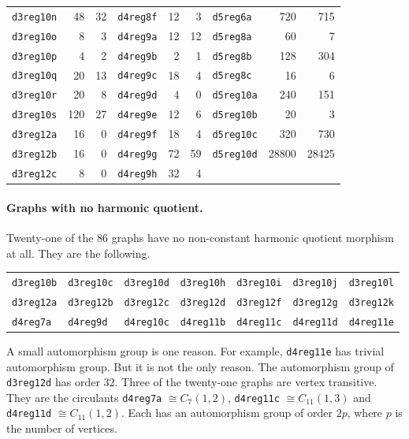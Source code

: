 \documentclass[12pt,letterpaper]{article}
\theoremstyle{definition}
\begin{document}
\begin{center}
\begin{tabular}{lrr|lrr|lrr}
{\tt d3reg10n} & 48 & 32 & {\tt d4reg8f} & 12 & 3 & {\tt d5reg6a} & 720 & 715 \\
{\tt d3reg10o} & 8 & 3 & {\tt d4reg9a} & 12 & 12 & {\tt d5reg8a} & 60 & 7 \\
{\tt d3reg10p} & 4 & 2 & {\tt d4reg9b} & 2 & 1 & {\tt d5reg8b} & 128 & 304 \\
{\tt d3reg10q} & 20 & 13 & {\tt d4reg9c} & 18 & 4 & {\tt d5reg8c} & 16 & 6 \\
{\tt d3reg10r} & 20 & 8 & {\tt d4reg9d} & 4 & 0 & {\tt d5reg10a} & 240 & 151 \\
{\tt d3reg10s} & 120 & 27 & {\tt d4reg9e} & 12 & 6 & {\tt d5reg10b} & 20 & 3 \\
{\tt d3reg12a} & 16 & 0 & {\tt d4reg9f} & 18 & 4 & {\tt d5reg10c} & 320 & 730 \\
{\tt d3reg12b} & 16 & 0 & {\tt d4reg9g} & 72 & 59 & {\tt d5reg10d} & 28800 & 28425 \\
{\tt d3reg12c} & 8 & 0 & {\tt d4reg9h} & 32 & 4 &  & &  \\
\hline
\end{tabular}
\end{center}

\paragraph{Graphs with no harmonic quotient.}
Twenty-one of the $86$ graphs have no non-constant harmonic quotient
morphism at all. They are the following.
\begin{center}
\begin{tabular}{lllllll}
{\tt d3reg10b} & {\tt d3reg10c} & {\tt d3reg10d} & {\tt d3reg10h} & {\tt d3reg10i} & {\tt d3reg10j} & {\tt d3reg10l} \\
{\tt d3reg12a} & {\tt d3reg12b} & {\tt d3reg12c} & {\tt d3reg12d} & {\tt d3reg12f} & {\tt d3reg12g} & {\tt d3reg12k} \\
{\tt d4reg7a} & {\tt d4reg9d} & {\tt d4reg10c} & {\tt d4reg11b} & {\tt d4reg11c} & {\tt d4reg11d} & {\tt d4reg11e} \\
\end{tabular}
\end{center}
 A small automorphism group is one reason.
For example, {\tt d4reg11e} has trivial automorphism group. But it is not
the only reason. The automorphism group of {\tt d3reg12d} has order $32$.
Three of the twenty-one graphs are vertex transitive. They are the
circulants {\tt d4reg7a} $\cong C_7(1,2)$, {\tt d4reg11c} $\cong C_{11}(1,3)$
and {\tt d4reg11d} $\cong C_{11}(1,2)$. Each has an automorphism group of
order $2p$, where $p$ is the number of vertices.
\end{document}
